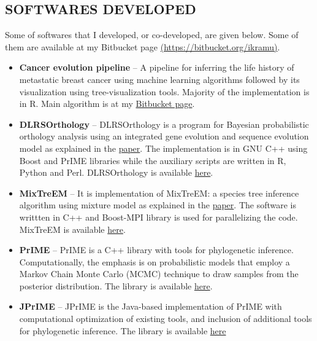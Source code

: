 \documentclass[margin, 10pt]{res} %
\begin{document}
\begin{resume}
\section{SOFTWARES DEVELOPED} 
Some of softwares that I developed, or co-developed, are given below. Some of them are available at my Bitbucket page \href{https://bitbucket.org/ikramu}{(https://bitbucket.org/ikramu)}.
\begin{itemize}
\item \textbf{Cancer evolution pipeline} -- A pipeline for inferring the life history of metastatic breast cancer using machine learning algorithms followed by its visualization using tree-visualization tools. Majority of the implementation is in R. Main algorithm is at my \href{https://bitbucket.org/ikramu/dolloparsimonyforcancerevolution}{Bitbucket page}. 
\item \textbf{DLRSOrthology} -- DLRSOrthology is a program for Bayesian probabilistic orthology analysis using an integrated gene evolution and sequence evolution model as explained in the \href{https://doi.org/10.1093/sysbio/syv044}{paper}. The implementation is in GNU C++ using Boost and PrIME libraries while the auxiliary scripts are written in R, Python and Perl. DLRSOrthology is available \href{https://bitbucket.org/ikramu/dlrsorthology}{here}.
\item \textbf{MixTreEM} -- It is implementation of MixTreEM: a species tree inference algorithm using mixture model as explained in the \href{https://doi.org/10.1093/molbev/msv115}{paper}. The software is writtten in C++ and Boost-MPI library is used for parallelizing the code. MixTreEM is available \href{https://bitbucket.org/ikramu/mixtreem}{here}.
\item \textbf{PrIME} -- PrIME is a C++ library with tools for phylogenetic inference. Computationally, the emphasis is on probabilistic models that employ a Markov Chain Monte Carlo (MCMC) technique to draw samples from the posterior distribution. The library is available \href{http://prime.scilifelab.se/}{here}.
\item \textbf{JPrIME} -- JPrIME is the Java-based implementation of PrIME with computational optimization of existing tools, and inclusion of additional tools for phylogenetic inference. The library is available \href{https://github.com/arvestad/jprime}{here}
\end{itemize}



\end{resume}
\end{document}

